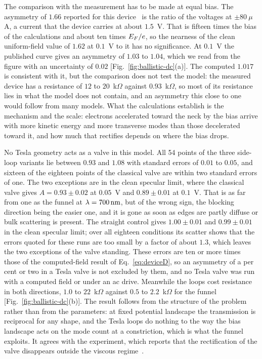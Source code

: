 The comparison with the measurement has to be made at equal bias. The
asymmetry of $1.66$ reported for this device~\cite{nguyen2021geometric} is
the ratio of the voltages at $\pm80\ \mu$A, a current that the device
carries at about $1.5$~V. That is fifteen times the bias of the
calculations and about ten times $E_{F}/e$, so the nearness of the clean
uniform-field value of $1.62$ at $0.1$~V to it has no significance. At
$0.1$~V the published curve gives an asymmetry of $1.03$ to $1.04$, which
we read from the figure with an uncertainty of $0.02$
[Fig.~\ref{fig:ballistic-dc}(a)]. The computed $1.017$ is consistent with
it, but the comparison does not test the model: the measured device has a
resistance of $12$ to
$20$~k$\Omega$ against $0.93$~k$\Omega$, so most of its
resistance lies in what the model does not contain, and an
asymmetry this close to one would follow from many models. What the calculations
establish is the mechanism and the scale: electrons accelerated toward
the neck by the bias arrive with more kinetic energy and more transverse
modes than those decelerated toward it, and how much that rectifies
depends on where the bias drops.

No Tesla geometry acts as a valve in this model. All 54 points of the three
side-loop variants lie between $0.93$ and $1.08$ with standard errors of
$0.01$ to $0.05$, and sixteen of the eighteen points of the classical valve
are within two standard errors of one. The two exceptions are in the clean
specular limit, where the classical valve gives $A=0.93\pm0.02$ at $0.05$~V
and $0.89\pm0.01$ at $0.1$~V. That is as far from one as the funnel at
$\lambda=700\,\mathrm{nm}$, but of the wrong sign, the blocking direction being
the easier one, and it is gone as soon as edges are partly diffuse or bulk
scattering is present. The straight control gives $1.00\pm0.01$ and
$0.99\pm0.01$ in the clean specular limit; over all eighteen conditions
its scatter shows that the errors quoted for these runs are too small by
a factor of about $1.3$, which leaves the two exceptions of the valve
standing. These
errors are ten or more times those of the computed-field result of
Eq.~\eqref{eq:deviceD}, so an asymmetry of a per cent or two in a Tesla
valve is not excluded by them, and no Tesla valve was run with a computed
field or under an ac drive. Meanwhile
the loops cost resistance in both directions, $1.0$ to $22$~k$\Omega$ against
$0.5$ to $2.2$~k$\Omega$ for the funnel [Fig.~\ref{fig:ballistic-dc}(b)]. The
result follows from the structure of the problem rather than from the
parameters: at fixed potential landscape the transmission is reciprocal for
any shape, and the Tesla loops do nothing to the way the bias landscape acts
on the mode count at a constriction, which is what the funnel exploits. It agrees with the experiment, which
reports that the rectification of the valve disappears outside the viscous
regime~\cite{geurs2020rectification}.

